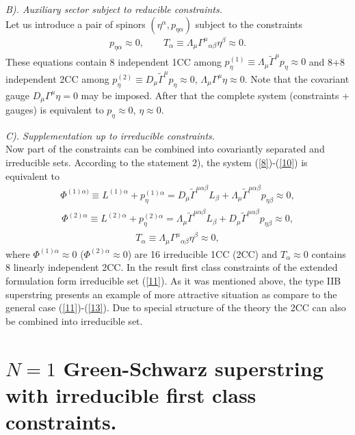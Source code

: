 \documentclass[a4paper]{article}
\begin{document}
{\em B). Auxiliary sector subject to reducible constraints.} \\ 
Let us introduce a pair of spinors
$(\eta^\alpha,p_{\eta\alpha})$ subject to the constraints
\begin{eqnarray}\label{10}
p_{\eta\alpha}\approx0, \qquad T_\alpha\equiv \Lambda_\mu
{\Gamma^\mu}_{\alpha\beta}\eta^\beta\approx0.
\end{eqnarray}
These equations contain 8 independent 1CC among $p^{(1)}_\eta\equiv
\Lambda_\mu\tilde\Gamma^\mu p_\eta\approx0$ and 8+8 independent 2CC
among $p^{(2)}_\eta\equiv D_\mu\tilde\Gamma^\mu p_\eta\approx0$,
$\Lambda_\mu\Gamma^\mu\eta\approx0$. Note that the covariant gauge
$D_\mu\Gamma^\mu\eta=0$ may be imposed. After that the complete system
(constraints + gauges) is equivalent to $p_\eta\approx0$,
$\eta\approx0$.

{\em C). Supplementation up to irreducible constraints.} \\ 
Now part of the constraints can be combined into covariantly separated
and irreducible sets. According to the statement 2), the system 
(\ref{8})-(\ref{10}) is equivalent to
\begin{eqnarray}\label{11}
\Phi^{(1)\alpha)}\equiv L^{(1)\alpha}+p^{(1)\alpha}_\eta=D_\mu
\tilde\Gamma^{\mu\alpha\beta}L_\beta+\Lambda_\mu
\tilde\Gamma^{\mu\alpha\beta} p_{\eta\beta}\approx 0,
\end{eqnarray} 
\begin{eqnarray}\label{12}
\Phi^{(2)\alpha}\equiv L^{(2)\alpha}+p^{(2)\alpha}_\eta=\Lambda_\mu
\tilde\Gamma^{\mu\alpha\beta}L_\beta+D_\mu
\tilde\Gamma^{\mu\alpha\beta} p_{\eta\beta}\approx0, 
\end{eqnarray}
\begin{eqnarray}\label{13}
T_\alpha\equiv \Lambda_\mu{\Gamma^\mu}_{\alpha\beta}\eta^\beta
\approx0,
\end{eqnarray}
where $\Phi^{(1)\alpha}\approx0$ 
($\Phi^{(2)\alpha}\approx0$) are 16 irreducible 1CC
(2CC) and $T_\alpha\approx0$ contains 8 linearly independent 2CC.
In the result first class constraints of the extended formulation form 
irreducible set (\ref{11}). As it was mentioned above, the type IIB 
superstring presents an example of more attractive
situation as compare to the general case (\ref{11})-(\ref{13}). Due to
special structure of the theory the 2CC can also be combined into
irreducible set.

\section{$N=1$ Green-Schwarz superstring with irreducible first 
class constraints.}
\end{document}
